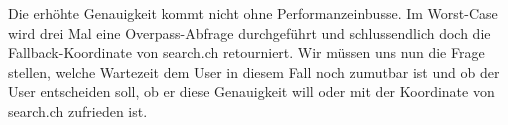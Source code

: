 Die erhöhte Genauigkeit kommt nicht ohne Performanzeinbusse. Im Worst-Case wird drei Mal eine Overpass-Abfrage \cite{wiki:overpass} durchgeführt und schlussendlich doch die Fallback-Koordinate von search.ch \cite{search_ch_route_api} retourniert. Wir müssen uns nun die Frage stellen, welche Wartezeit dem User in diesem Fall noch zumutbar ist und ob der User entscheiden soll, ob er diese Genauigkeit will oder mit der Koordinate von search.ch \cite{search_ch_route_api} zufrieden ist.

